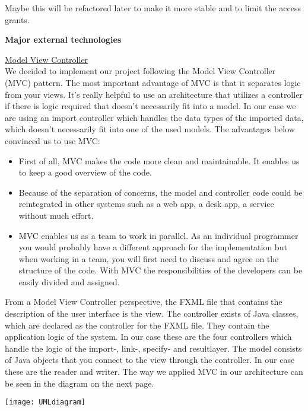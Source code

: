 \documentclass[a4paper,english,fleqn]{exam}
\begin{document}
Maybe this will be refactored later to make it more stable and to limit the access grants. 



\newpage
\textbf{Major external technologies}


\underline{Model View Controller} \\

We decided to implement our project following the Model View Controller (MVC) pattern. The most important advantage of MVC is that it separates logic from your views. It's really helpful to use an architecture that utilizes a controller if there is logic required that doesn't necessarily fit into a model. In our case we are using an import controller which handles the data types of the imported data, which doesn't necessarily fit into one of the used models. The advantages below convinced us to use MVC:

\begin{itemize}
\item First of all, MVC makes the code more clean and maintainable. It enables us to keep a good overview of the code.

\item Because of the separation of concerns, the model and controller code could be reintegrated in other systems such as a web app, a desk app, a service without much effort.

\item MVC enables us as a team to work in parallel. As an individual programmer you would probably have a different approach for the implementation but when working in a team, you will first need to discuss and agree on the structure of the code. With MVC the responsibilities of the developers can be easily divided and assigned.
\end{itemize}

From a Model View Controller perspective, the FXML file that contains the description of the user interface is the view. The controller exists of Java classes, which are declared as the controller for the FXML file. They contain the application logic of the system. In our case these are the four controllers which handle the logic of the import-, link-, specify- and resultlayer. The model consists of Java objects that you connect to the view through the controller. In our case these are the reader and writer. The way we applied MVC in our architecture can be seen in the diagram on the next page.

\texttt{[image: UMLdiagram]}
\end{document}
